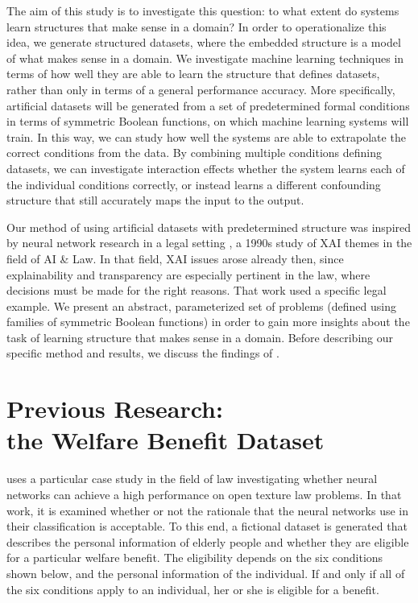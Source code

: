 \documentclass[letterpaper]{article} %
\begin{document}
The aim of this study is to investigate this question: to what extent do systems learn structures that make sense in a domain? In order to operationalize this idea, we generate structured datasets, where the embedded structure is a model of what makes sense in a domain. We investigate machine learning techniques in terms of how well they are able to learn the structure that defines datasets, rather than only in terms of a general performance accuracy. More specifically, artificial datasets will be generated from a set of predetermined formal conditions in terms of symmetric Boolean functions, on which machine learning systems will train. In this way, we can study how well the systems are able to extrapolate the correct conditions from the data. By combining multiple conditions defining datasets, we can investigate interaction effects whether the system learns each of the individual conditions correctly, or instead learns a different confounding structure that still accurately maps the input to the output. 

Our method of using artificial datasets with predetermined structure was inspired by neural network research in a legal setting \cite{bench1993neural}, a 1990s study of XAI themes in the field of AI \& Law. In that field, XAI issues arose already then, since explainability and transparency are especially pertinent in the law, where decisions must be made for the right reasons. That work used a specific legal example. We present an abstract, parameterized set of problems (defined using families of symmetric Boolean functions) in order to gain more insights about the task of learning structure that makes sense in a domain. Before describing our specific method and results, we discuss the findings of \cite{bench1993neural}.

\section{Previous Research:  \\the Welfare Benefit Dataset}
\cite{bench1993neural} uses a particular case study in the field of law investigating whether neural networks can achieve a high performance on open texture law problems. In that work, it is examined whether or not the rationale that the neural networks use in their classification is acceptable. To this end, a fictional dataset is generated that describes the personal information of elderly people and whether they are eligible for a particular welfare benefit. The eligibility depends on the six conditions shown below, and the personal information of the individual. If and only if all of the six conditions apply to an individual, her or she is eligible for a benefit. 
\end{document}
